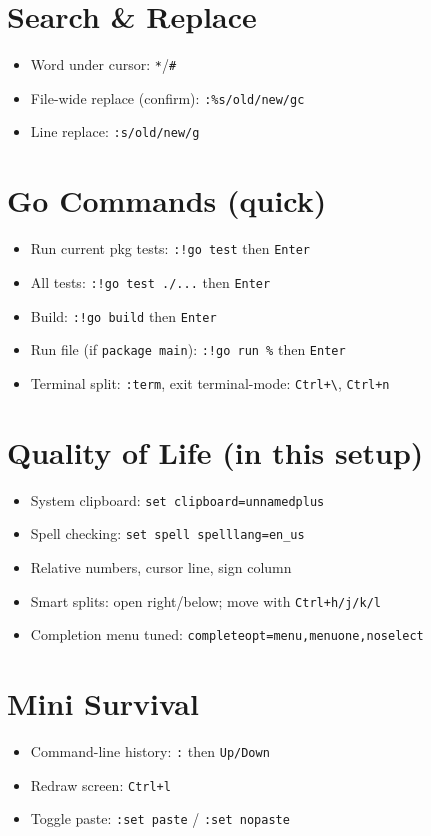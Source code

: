 \documentclass[9pt,twocolumn]{extarticle}
\newcommand{\key}[1]{\mbox{\texttt{#1}}}
\begin{document}
\section{Search \& Replace}
\begin{itemize}
  \item Word under cursor: \key{*}/\key{\#}
  \item File-wide replace (confirm): \key{:\%s/old/new/gc}
  \item Line replace: \key{:s/old/new/g}
\end{itemize}

\section{Go Commands (quick)}
\begin{itemize}
  \item Run current pkg tests: \key{:!go test} then \key{Enter}
  \item All tests: \key{:!go test ./...} then \key{Enter}
  \item Build: \key{:!go build} then \key{Enter}
  \item Run file (if \texttt{package main}): \key{:!go run \%} then \key{Enter}
  \item Terminal split: \key{:term}, exit terminal-mode: \key{Ctrl+\textbackslash}, \key{Ctrl+n}
\end{itemize}

\section{Quality of Life (in this setup)}
\begin{itemize}
  \item System clipboard: \texttt{set clipboard=unnamedplus}
  \item Spell checking: \texttt{set spell spelllang=en\_us}
  \item Relative numbers, cursor line, sign column
  \item Smart splits: open right/below; move with \key{Ctrl+h/j/k/l}
  \item Completion menu tuned: \texttt{completeopt=menu,menuone,noselect}
\end{itemize}

\section{Mini Survival}
\begin{itemize}
  \item Command-line history: \key{:} then \key{Up/Down}
  \item Redraw screen: \key{Ctrl+l}
  \item Toggle paste: \key{:set paste} / \key{:set nopaste}
\end{itemize}
\end{document}
